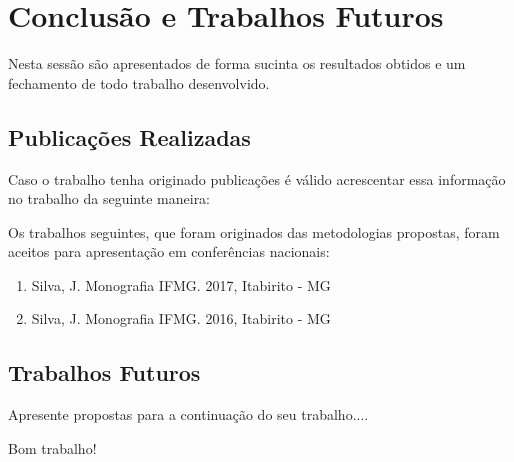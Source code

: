 
\chapter{Conclusão e Trabalhos Futuros}\label{conclusao}

Nesta sessão são apresentados de forma sucinta os resultados obtidos e um fechamento de todo trabalho desenvolvido.



\section{Publicações Realizadas}\label{publicacoes}

Caso o trabalho tenha originado publicações é válido acrescentar essa informação no trabalho da seguinte maneira:

Os trabalhos seguintes, que foram originados das metodologias propostas, foram aceitos para apresentação em conferências nacionais:

\begin{enumerate}
   \item Silva, J. Monografia IFMG. 2017, Itabirito - MG
   \item Silva, J. Monografia IFMG. 2016, Itabirito - MG  
\end{enumerate}

\section{Trabalhos Futuros}\label{trabalhosFuturos}

Apresente propostas para a continuação do seu trabalho....

\vspace{4cm}
\begin{center}
    \Large Bom trabalho! 
    
    \dSmiley[5][yellow]
\end{center}


